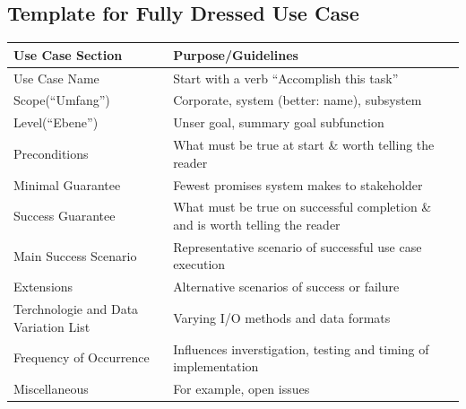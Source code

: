 \subsection{Template for Fully Dressed Use Case}
\begin{table}[H]
    \centering
    \renewcommand{\arraystretch}{1.2}
    \begin{tabular}{lll}
        \toprule
        Use Case Section & Purpose/Guidelines \\
        \midrule
        Use Case Name & Start with a verb \enquote{Accomplish this task} \\
        Scope(\enquote{Umfang}) & Corporate, system (better: name), subsystem \\
        Level(\enquote{Ebene}) & Unser goal, summary goal subfunction \\
        Preconditions & What must be true at start \& worth telling the reader\\
        Minimal Guarantee & Fewest promises system makes to stakeholder\\
        Success Guarantee & What must be true on successful completion \& and is worth telling the reader\\
        Main Success Scenario & Representative scenario of successful use case execution\\
        Extensions & Alternative scenarios of success or failure\\
        Terchnologie and Data Variation List & Varying I/O methods and data formats\\
        Frequency of Occurrence & Influences inverstigation, testing and timing of implementation\\
        Miscellaneous & For example, open issues\\
        \bottomrule
    \end{tabular}
\end{table}

